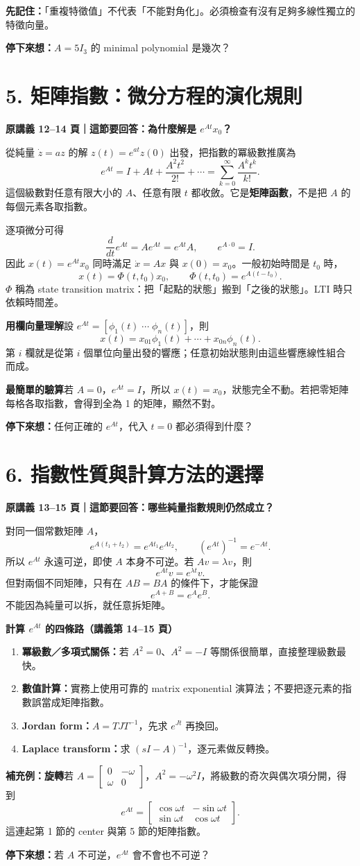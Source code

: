 \documentclass[12pt,a4paper]{article}
\newcommand{\topic}[3]{\clearpage\section*{#1}\textcolor{accent}{\textbf{原講義 #2 頁｜這節要回答：#3}}\par}
\newcommand{\key}[1]{\par\textcolor{accent}{\textbf{先記住：}}#1\par}
\newcommand{\checkq}[1]{\par\textbf{停下來想：}#1\par}
\begin{document}
\key{「重複特徵值」不代表「不能對角化」。必須檢查有沒有足夠多線性獨立的特徵向量。}
\checkq{$A=5I_3$ 的 minimal polynomial 是幾次？}

\topic{5. 矩陣指數：微分方程的演化規則}{12--14}{為什麼解是 $e^{At}x_0$？}
從純量 $\dot z=az$ 的解 $z(t)=e^{at}z(0)$ 出發，把指數的冪級數推廣為
\[
\boxed{e^{At}=I+At+\frac{A^2t^2}{2!}+\cdots
 =\sum_{k=0}^{\infty}\frac{A^kt^k}{k!}.}
\]
這個級數對任意有限大小的 $A$、任意有限 $t$ 都收斂。它是\textbf{矩陣函數}，不是把 $A$ 的每個元素各取指數。

逐項微分可得
\[
 \frac{d}{dt}e^{At}=Ae^{At}=e^{At}A,\qquad e^{A\cdot0}=I.
\]
因此 $x(t)=e^{At}x_0$ 同時滿足 $\dot x=Ax$ 與 $x(0)=x_0$。一般初始時間是 $t_0$ 時，
\[
\boxed{x(t)=\Phi(t,t_0)x_0,\qquad \Phi(t,t_0)=e^{A(t-t_0)}.}
\]
$\Phi$ 稱為 state transition matrix：把「起點的狀態」搬到「之後的狀態」。LTI 時只依賴時間差。

\textbf{用欄向量理解}\quad 設 $e^{At}=[\phi_1(t)\;\cdots\;\phi_n(t)]$，則
\[
 x(t)=x_{01}\phi_1(t)+\cdots+x_{0n}\phi_n(t).
\]
第 $i$ 欄就是從第 $i$ 個單位向量出發的響應；任意初始狀態則由這些響應線性組合而成。

\textbf{最簡單的驗算}\quad 若 $A=0$，$e^{At}=I$，所以 $x(t)=x_0$，狀態完全不動。若把零矩陣每格各取指數，會得到全為 1 的矩陣，顯然不對。
\checkq{任何正確的 $e^{At}$，代入 $t=0$ 都必須得到什麼？}

\topic{6. 指數性質與計算方法的選擇}{13--15}{哪些純量指數規則仍然成立？}
對同一個常數矩陣 $A$，
\[
 e^{A(t_1+t_2)}=e^{At_1}e^{At_2},\qquad
 (e^{At})^{-1}=e^{-At}.
\]
所以 $e^{At}$ 永遠可逆，即使 $A$ 本身不可逆。若 $Av=\lambda v$，則
\[
 e^{At}v=e^{\lambda t}v.
\]
但對兩個不同矩陣，只有在 $AB=BA$ 的條件下，才能保證
\[
 e^{A+B}=e^Ae^B.
\]
不能因為純量可以拆，就任意拆矩陣。

\textbf{計算 $e^{At}$ 的四條路（講義第 14--15 頁）}
\begin{enumerate}
\item \textbf{冪級數／多項式關係：}若 $A^2=0$、$A^2=-I$ 等關係很簡單，直接整理級數最快。
\item \textbf{數值計算：}實務上使用可靠的 matrix exponential 演算法；不要把逐元素的指數誤當成矩陣指數。
\item \textbf{Jordan form：}$A=TJT^{-1}$，先求 $e^{Jt}$ 再換回。
\item \textbf{Laplace transform：}求 $(sI-A)^{-1}$，逐元素做反轉換。
\end{enumerate}
\textbf{補充例：旋轉}\quad 若 $A=\begin{bmatrix}0&-\omega\\\omega&0\end{bmatrix}$，$A^2=-\omega^2I$，將級數的奇次與偶次項分開，得到
\[
 e^{At}=\begin{bmatrix}\cos\omega t&-\sin\omega t\\
 \sin\omega t&\cos\omega t\end{bmatrix}.
\]
這連起第 1 節的 center 與第 5 節的矩陣指數。
\checkq{若 $A$ 不可逆，$e^{At}$ 會不會也不可逆？}
\end{document}
